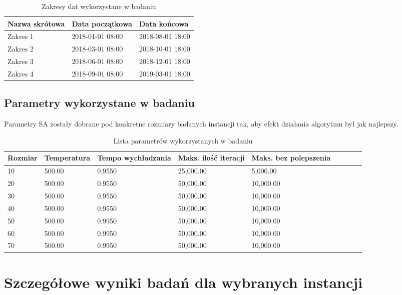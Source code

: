 \begin{table}[H]
    \centering
    \begin{tabular}[width=\textwidth]{ | l | l | l |}
        \hline
        \bfseries Nazwa skrótowa & \bfseries Data początkowa & \bfseries Data końcowa \\
        \hline
        Zakres 1 & 2018-01-01 08:00 & 2018-08-01 18:00 \\
        \hline
        Zakres 2 & 2018-03-01 08:00 & 2018-10-01 18:00 \\
        \hline
        Zakres 3 & 2018-06-01 08:00 & 2018-12-01 18:00 \\
        \hline
        Zakres 4 & 2018-09-01 08:00 & 2019-03-01 18:00 \\
        \hline
    \end{tabular}
    \caption{Zakresy dat wykorzystane w badaniu}
\end{table}

\subsection{Parametry wykorzystane w badaniu}
Parametry SA zostały dobrane pod konkretne rozmiary badanych instancji tak, aby efekt
działania algorytmu był jak najlepszy.
\begin{table}[H]
\centering
\begin{tabular}[\textwidth]{ | l | l | l | l | l | l | l | l | l | }
\hline
\bfseries Rozmiar & \bfseries Temperatura & \bfseries Tempo wychładzania
	     & \bfseries Maks. ilość iteracji & \bfseries Maks. bez polepszenia\\
\hline
10 & 500.00 & 0.9550 & 25,000.00 & 5,000.00 \\
\hline
20 & 500.00 & 0.9550 & 50,000.00 & 10,000.00 \\
\hline
30 & 500.00 & 0.9550 & 50,000.00 & 10,000.00 \\
\hline
40 & 500.00 & 0.9550 & 50,000.00 & 10,000.00 \\
\hline
50 & 500.00 & 0.9950 & 50,000.00 & 10,000.00 \\
\hline
60 & 500.00 & 0.9950 & 50,000.00 & 10,000.00 \\
\hline
70 & 500.00 & 0.9950 & 50,000.00 & 10,000.00 \\
\hline
\end{tabular}
\caption{Lista parametrów wykorzystanych w badaniu}
\end{table}

\newpage
\section{Szczegółowe wyniki badań dla wybranych instancji}
